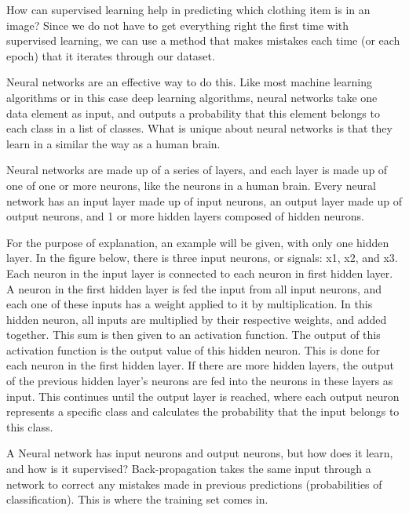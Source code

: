 \documentclass[12pt]{article} %
\begin{document}
	How can supervised learning help in predicting which clothing item is in an image? Since we do not have to get everything right the first time with supervised learning, we can use a method that makes mistakes each time (or each epoch) that it iterates through our dataset. 

Neural networks are an effective way to do this. Like most machine learning algorithms or in this case deep learning algorithms, neural networks take one data element as input, and outputs a probability that this element belongs to each class in a list of classes. What is unique about neural networks is that they learn in a similar the way as a human brain. 

Neural networks are made up of a series of layers, and each layer is made up of one of one or more neurons, like the neurons in a human brain. Every neural network has an input layer made up of input neurons, an output layer made up of output neurons, and 1 or more hidden layers composed of hidden neurons. 

For the purpose of explanation, an example will be given, with only one hidden layer. In the figure below, there is three input neurons, or signals: x1, x2, and x3. Each neuron in the input layer is connected to each neuron in first hidden layer. A neuron in the first hidden layer is fed the input from all input neurons, and each one of these inputs has a weight applied to it by multiplication. In this hidden neuron, all inputs are multiplied by their respective weights, and added together. This sum is then given to an activation function. The output of this activation function is the output value of this hidden neuron. This is done for each neuron in the first hidden layer. If there are more hidden layers, the output of the previous hidden layer's neurons are fed into the neurons in these layers as input. This continues until the output layer is reached, where each output neuron represents a specific class and calculates the probability that the input belongs to this class.\cite{KubatMachineLearn}
	
 	A Neural network has input neurons and output neurons, but how does it learn, and how is it supervised? Back-propagation takes the same input through a network to correct any mistakes made in previous predictions (probabilities of classification). This is where the training set comes in. 
\end{document}
